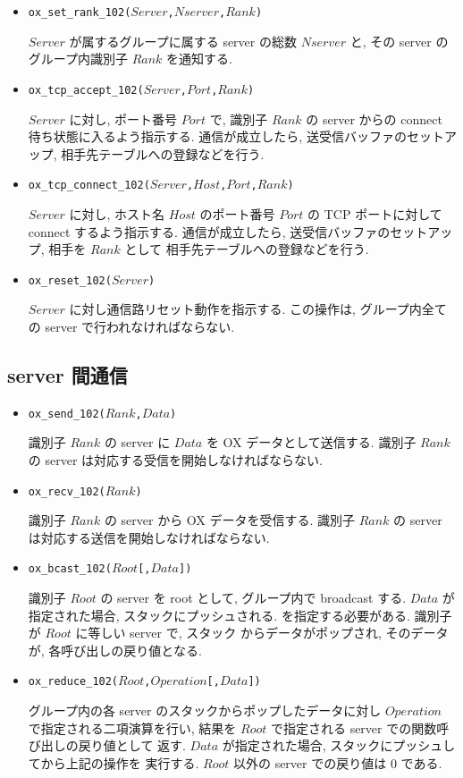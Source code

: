 \documentclass[12pt]{jarticle}
\begin{document}
\begin{itemize}
\item {\tt ox\_set\_rank\_102($Server$,$Nserver$,$Rank$)}

$Server$ が属するグループに属する server の総数 $Nserver$ と,
その server のグループ内識別子 $Rank$ を通知する. 

\item {\tt ox\_tcp\_accept\_102($Server$,$Port$,$Rank$)}

$Server$ に対し, ポート番号 $Port$ で, 
識別子 $Rank$ の server からの connect 待ち状態に入るよう指示する.
通信が成立したら, 送受信バッファのセットアップ, 
相手先テーブルへの登録などを行う.

\item {\tt ox\_tcp\_connect\_102($Server$,$Host$,$Port$,$Rank$)}

$Server$ に対し, ホスト名 $Host$ のポート番号 $Port$ の TCP ポートに対して 
connect するよう指示する.
通信が成立したら, 送受信バッファのセットアップ, 相手を $Rank$ として
相手先テーブルへの登録などを行う.

\item {\tt ox\_reset\_102($Server$)}

$Server$ に対し通信路リセット動作を指示する. この操作は, グループ内全ての server 
で行われなければならない.
\end{itemize}

\subsection{server 間通信}

\begin{itemize}
\item {\tt ox\_send\_102($Rank$,$Data$)}

識別子 $Rank$ の server に $Data$ を OX データとして送信する.
識別子 $Rank$ の server は対応する受信を開始しなければならない.

\item {\tt ox\_recv\_102($Rank$)}

識別子 $Rank$ の server から OX データを受信する.
識別子 $Rank$ の server は対応する送信を開始しなければならない.

\item {\tt ox\_bcast\_102($Root$[,$Data$])}

識別子 $Root$ の server を root として, グループ内で broadcast する.
$Data$ が指定された場合, スタックにプッシュされる.
を指定する必要がある. 識別子が $Root$ に等しい server で, スタック
からデータがポップされ, そのデータが, 各呼び出しの戻り値となる.

\item {\tt ox\_reduce\_102($Root$,$Operation$[,$Data$])}

グループ内の各 server のスタックからポップしたデータに対し
$Operation$ で指定される二項演算を行い,
結果を $Root$ で指定される server での関数呼び出しの戻り値として
返す.
$Data$ が指定された場合, スタックにプッシュしてから上記の操作を
実行する. $Root$ 以外の server での戻り値は 0 である.

\end{itemize}
\end{document}
